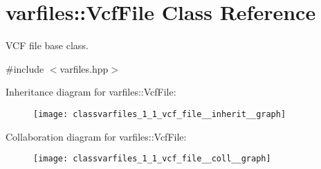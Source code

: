 \hypertarget{classvarfiles_1_1_vcf_file}{}\section{varfiles\+:\+:Vcf\+File Class Reference}
\label{classvarfiles_1_1_vcf_file}


V\+CF file base class.  




{\ttfamily \#include $<$varfiles.\+hpp$>$}



Inheritance diagram for varfiles\+:\+:Vcf\+File\+:\nopagebreak
\begin{figure}[H]
\begin{center}
\leavevmode
\texttt{[image: classvarfiles\_1\_1\_vcf\_file\_\_inherit\_\_graph]}
\end{center}
\end{figure}


Collaboration diagram for varfiles\+:\+:Vcf\+File\+:\nopagebreak
\begin{figure}[H]
\begin{center}
\leavevmode
\texttt{[image: classvarfiles\_1\_1\_vcf\_file\_\_coll\_\_graph]}
\end{center}
\end{figure}
